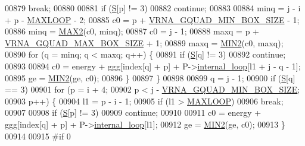 \begin{DoxyCode}
00879       \textcolor{keywordflow}{break};
00880 
00881     \textcolor{keywordflow}{if} (\mbox{\hyperlink{group__energy__parameters__rw_gga7bf2bb363bcf5ce50d60255d256e5682af1ce01387d2348f8b858721a7db81670}{S}}[p] != 3)
00882       \textcolor{keywordflow}{continue};
00883 
00884     minq  = j - i + p - \mbox{\hyperlink{energy__const_8h_ad1bd6eabac419670ddd3c9ed82145988}{MAXLOOP}} - 2;
00885     c0    = p + \mbox{\hyperlink{group__energy__parameters_gad7bdd880afca461f97763d79ee57a347}{VRNA\_GQUAD\_MIN\_BOX\_SIZE}} - 1;
00886     minq  = \mbox{\hyperlink{group__utils_ga33297b3679c713b0c4d897cd0fe3b122}{MAX2}}(c0, minq);
00887     c0    = j - 1;
00888     maxq  = p + \mbox{\hyperlink{group__energy__parameters_ga56cafabad2f8a7db83f2d5d3b0e8d313}{VRNA\_GQUAD\_MAX\_BOX\_SIZE}} + 1;
00889     maxq  = \mbox{\hyperlink{group__utils_gae0b9cd0ce090bd69b951aa73e8fa4f7d}{MIN2}}(c0, maxq);
00890     \textcolor{keywordflow}{for} (q = minq; q < maxq; q++) \{
00891       \textcolor{keywordflow}{if} (\mbox{\hyperlink{group__energy__parameters__rw_gga7bf2bb363bcf5ce50d60255d256e5682af1ce01387d2348f8b858721a7db81670}{S}}[q] != 3)
00892         \textcolor{keywordflow}{continue};
00893 
00894       c0  = energy + ggg[index[q] + p] + P->\mbox{\hyperlink{group__energy__parameters_a2a4fb2c65023ec371c9b96573da6d2fc}{internal\_loop}}[l1 + j - q - 1];
00895       ge  = \mbox{\hyperlink{group__utils_gae0b9cd0ce090bd69b951aa73e8fa4f7d}{MIN2}}(ge, c0);
00896     \}
00897   \}
00898 
00899   q = j - 1;
00900   \textcolor{keywordflow}{if} (\mbox{\hyperlink{group__energy__parameters__rw_gga7bf2bb363bcf5ce50d60255d256e5682af1ce01387d2348f8b858721a7db81670}{S}}[q] == 3)
00901     \textcolor{keywordflow}{for} (p = i + 4;
00902          p < j - \mbox{\hyperlink{group__energy__parameters_gad7bdd880afca461f97763d79ee57a347}{VRNA\_GQUAD\_MIN\_BOX\_SIZE}};
00903          p++) \{
00904       l1 = p - i - 1;
00905       \textcolor{keywordflow}{if} (l1 > \mbox{\hyperlink{energy__const_8h_ad1bd6eabac419670ddd3c9ed82145988}{MAXLOOP}})
00906         \textcolor{keywordflow}{break};
00907 
00908       \textcolor{keywordflow}{if} (\mbox{\hyperlink{group__energy__parameters__rw_gga7bf2bb363bcf5ce50d60255d256e5682af1ce01387d2348f8b858721a7db81670}{S}}[p] != 3)
00909         \textcolor{keywordflow}{continue};
00910 
00911       c0  = energy + ggg[index[q] + p] + P->\mbox{\hyperlink{group__energy__parameters_a2a4fb2c65023ec371c9b96573da6d2fc}{internal\_loop}}[l1];
00912       ge  = \mbox{\hyperlink{group__utils_gae0b9cd0ce090bd69b951aa73e8fa4f7d}{MIN2}}(ge, c0);
00913     \}
00914 
00915 \textcolor{preprocessor}{#if 0}

\end{DoxyCode}
